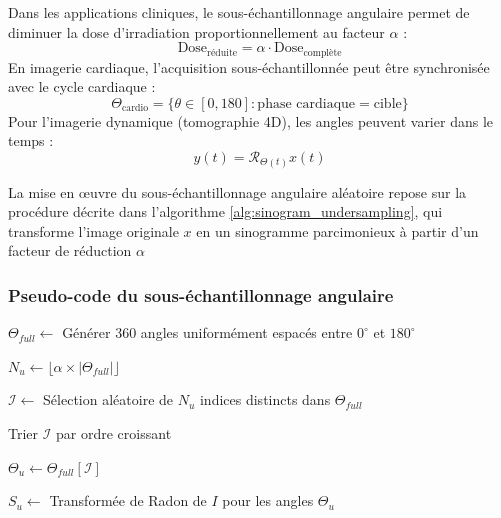 Dans les applications cliniques, le sous-échantillonnage angulaire permet de diminuer la dose d'irradiation proportionnellement au facteur \(\alpha\) :
\begin{equation}
\text{Dose}_{\text{réduite}} = \alpha \cdot \text{Dose}_{\text{complète}}
\end{equation}
En imagerie cardiaque, l'acquisition sous-échantillonnée peut être synchronisée avec le cycle cardiaque :
\begin{equation}
\Theta_{\text{cardio}} = \{\theta \in [0,180] : \text{phase cardiaque} = \text{cible}\}
\end{equation}
Pour l'imagerie dynamique (tomographie 4D), les angles peuvent varier dans le temps :
\begin{equation}
y(t) = \mathcal{R}_{\Theta(t)}x(t)
\end{equation}

La mise en œuvre du sous-échantillonnage angulaire aléatoire repose sur la procédure décrite dans l'algorithme \ref{alg:sinogram_undersampling}, qui transforme l'image originale \(x\) en un sinogramme parcimonieux à partir d'un facteur de réduction $\alpha$
\subsubsection*{Pseudo-code du sous-échantillonnage angulaire}
\begin{algorithm}[H]
    \caption{Génération d'un sinogramme sous-échantillonné (Sparse-View CT)}
    \label{alg:sinogram_undersampling}
    \KwIn{Image $I$, facteur de sous-échantillonnage $\alpha \in (0,1]$}

    $\Theta_{full} \leftarrow$ Générer 360 angles uniformément espacés entre $0^\circ$ et $180^\circ$\;

    $N_u \leftarrow \lfloor \alpha \times |\Theta_{full}| \rfloor$\;

    $\mathcal{I} \leftarrow$ Sélection aléatoire de $N_u$ indices distincts dans $\Theta_{full}$\;

    Trier $\mathcal{I}$ par ordre croissant\;

    $\Theta_u \leftarrow \Theta_{full}[\mathcal{I}]$\;

    $S_u \leftarrow$ Transformée de Radon de $I$ pour les angles $\Theta_u$\;

    \;
\end{algorithm}

